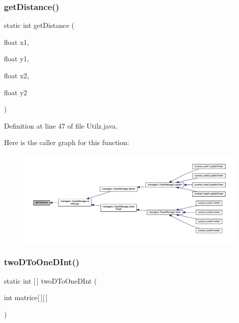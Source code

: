 \subsubsection{\texorpdfstring{get\+Distance()}{getDistance()}}
{\footnotesize\ttfamily static int get\+Distance (\begin{DoxyParamCaption}\item[{float}]{x1,  }\item[{float}]{y1,  }\item[{float}]{x2,  }\item[{float}]{y2 }\end{DoxyParamCaption})\hspace{0.3cm}{\ttfamily [static]}}



Definition at line 47 of file Utilz.\+java.

Here is the caller graph for this function\+:\nopagebreak
\begin{figure}[H]
\begin{center}
\leavevmode
\includegraphics[width=350pt]{classhelpz_1_1_utilz_a8a4c702547acd44cb113b787ae1d3e05_icgraph}
\end{center}
\end{figure}
\mbox{\label{classhelpz_1_1_utilz_a3a92fdb2e1e33fa3daadbdea23200fcc}} 
\subsubsection{\texorpdfstring{two\+D\+To\+One\+D\+Int()}{twoDToOneDInt()}}
{\footnotesize\ttfamily static int \mbox{[}$\,$\mbox{]} two\+D\+To\+One\+D\+Int (\begin{DoxyParamCaption}\item[{int}]{matrice\mbox{[}$\,$\mbox{]}\mbox{[}$\,$\mbox{]} }\end{DoxyParamCaption})\hspace{0.3cm}{\ttfamily [static]}}



